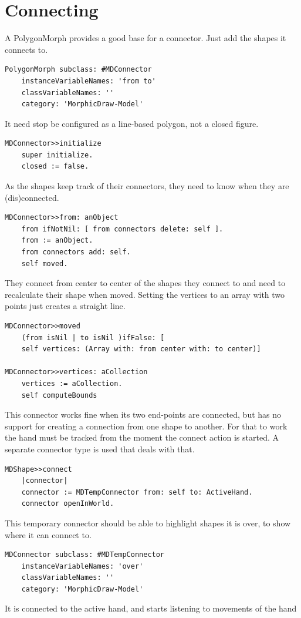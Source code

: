 \documentclass[10pt]{article}   	%
\begin{document}
\section{Connecting}
A PolygonMorph provides a good base for a connector.
Just add the shapes it connects to.
\begin{verbatim}
PolygonMorph subclass: #MDConnector
    instanceVariableNames: 'from to'
    classVariableNames: ''
    category: 'MorphicDraw-Model'
\end{verbatim}
It need stop be configured as a line-based polygon, not a
closed figure.
\begin{verbatim}
MDConnector>>initialize
    super initialize.
    closed := false.
\end{verbatim}
As the shapes keep track of their connectors, they need
to know when they are (dis)connected.
\begin{verbatim}
MDConnector>>from: anObject
    from ifNotNil: [ from connectors delete: self ].
    from := anObject.
    from connectors add: self.
    self moved.
\end{verbatim}
They connect from center to center of the shapes they connect to
and need to recalculate their shape when moved. Setting the 
vertices to an array with two points just creates a straight line.
\begin{verbatim}
MDConnector>>moved
    (from isNil | to isNil )ifFalse: [
    self vertices: (Array with: from center with: to center)]

MDConnector>>vertices: aCollection
	vertices := aCollection.
	self computeBounds
\end{verbatim}
This connector works fine when its two end-points are connected,
but has no support for creating a connection from one shape to 
another. For that to work the hand must be tracked from the
moment the connect action is started. A separate connector
type is used that deals with that.
\begin{verbatim}
MDShape>>connect
    |connector|
    connector := MDTempConnector from: self to: ActiveHand.
    connector openInWorld.
\end{verbatim}
This temporary connector should be able to highlight shapes it is 
over, to show where it can connect to.
\begin{verbatim}
MDConnector subclass: #MDTempConnector
    instanceVariableNames: 'over'
    classVariableNames: ''
    category: 'MorphicDraw-Model'
\end{verbatim}
It is connected to the active hand, and starts listening to
movements of the hand
\end{document}

